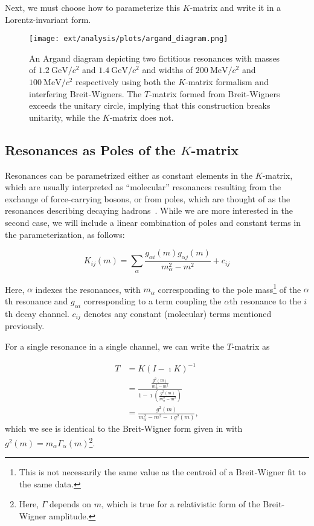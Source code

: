 Next, we must choose how to parameterize this $K$-matrix and write it in a Lorentz-invariant form.

\begin{figure}
  \begin{center}
    \texttt{[image: ext/analysis/plots/argand\_diagram.png]}
  \end{center}
  \caption{An Argand diagram depicting two fictitious resonances with masses of $\SI{1.2}{\giga\eV}/c^2$ and $\SI{1.4}{\giga\eV}/c^2$ and widths of $\SI{200}{\mega\eV}/c^2$ and $\SI{100}{\mega\eV}/c^2$ respectively using both the $K$-matrix formalism and interfering Breit-Wigners. The $T$-matrix formed from Breit-Wigners exceeds the unitary circle, implying that this construction breaks unitarity, while the $K$-matrix does not.}\label{fig:argand-diagram}
\end{figure}

\subsection{Resonances as Poles of the $K$-matrix}

Resonances can be parametrized either as constant elements in the $K$-matrix, which are usually interpreted as ``molecular'' resonances resulting from the exchange of force-carrying bosons, or from poles, which are thought of as the resonances describing decaying hadrons~\cite{Au1987}. While we are more interested in the second case, we will include a linear combination of poles and constant terms in the parameterization, as follows:

\begin{equation}
  K_{ij}(m) = \sum_{\alpha} \frac{g_{\alpha i}(m) g_{\alpha j}(m)}{m_\alpha^2 - m^2} + c_{ij}
  \label{eq:k-matrix-parameterization}
\end{equation}

Here, $\alpha$ indexes the resonances, with $m_\alpha$ corresponding to the pole mass\footnote{This is not necessarily the same value as the centroid of a Breit-Wigner fit to the same data.} of the $\alpha$th resonance and $g_{\alpha i}$ corresponding to a term coupling the $\alpha$th resonance to the $i$th decay channel. $c_{ij}$ denotes any constant (molecular) terms mentioned previously.

For a single resonance in a single channel, we can write the $T$-matrix as

\begin{align}
  T &= K(I-\imath K)^{-1} \\
    &= \frac{\frac{g^2(m)}{m_\alpha^2 - m^2}}{1 - \imath \left(\frac{g^2(m)}{m_\alpha^2 - m^2}\right)} \\
    &= \frac{g^2(m)}{m_\alpha^2 - m^2 - \imath g^2(m)},
\end{align}
which we see is identical to the Breit-Wigner form given in  with $g^2(m) = m_\alpha\Gamma_\alpha(m)$\footnote{Here, $\Gamma$ depends on $m$, which is true for a relativistic form of the Breit-Wigner amplitude.}.

